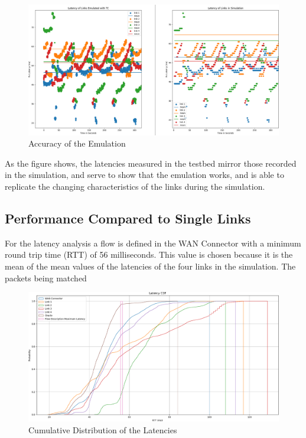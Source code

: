 \begin{figure}[h]
    \centering
        \includegraphics[height=0.66\textwidth,width=\textwidth]{fig/sim_vs_em_compariso.png}
        \caption{Accuracy of the Emulation}
        \label{fig:sim_vs_em}
\end{figure}

As the figure shows,  the latencies measured in the testbed mirror those recorded in the simulation, and serve to show that the emulation works, and is able to replicate the changing characteristics of the links during the simulation.

\subsection{Performance Compared to Single Links}

For the latency analysis a flow is defined in the WAN Connector with a minimum round trip time (RTT) of 56 milliseconds. This value is chosen because it is the mean of the mean values of the latencies of the four links in the simulation. The packets being matched 

\begin{figure}[h]
    \centering
        \includegraphics[height=0.66\textwidth,width=\textwidth]{fig/latency_cdf1.png}
        \caption{Cumulative Distribution of the Latencies}
        \label{fig:latency_cdf1}
\end{figure}

